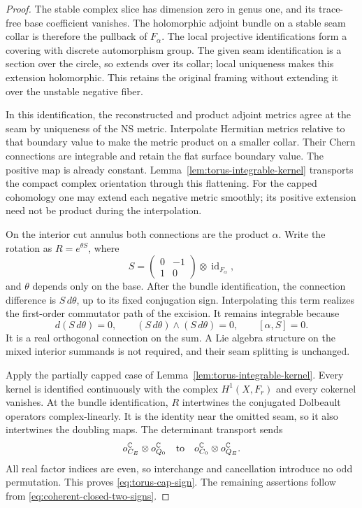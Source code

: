 \documentclass[11pt]{amsart}
\theoremstyle{definition}
\theoremstyle{remark}
\theoremstyle{plain}
\newcommand{\CC}{\mathbb{C}}
\newcommand{\id}{\operatorname{id}}
\begin{document}
\begin{proof}
The stable complex slice has dimension
zero in genus one, and its trace-free
base coefficient vanishes. The
holomorphic adjoint bundle on a stable
seam collar is therefore the pullback
of $F_\alpha$. The local projective
identifications form a covering with
discrete automorphism group. The
given seam identification is a section
over the circle, so extends over its
collar; local uniqueness makes this
extension holomorphic. This retains
the original framing without extending
it over the unstable negative fiber.

In this identification, the reconstructed
and product adjoint metrics agree at
the seam by uniqueness of the NS
metric. Interpolate Hermitian metrics
relative to that boundary value to
make the metric product on a smaller
collar. Their Chern connections are
integrable and retain the flat surface
boundary value. The positive map is
already constant.
Lemma~\ref{lem:torus-integrable-kernel}
transports the compact complex
orientation through this flattening.
For the capped cohomology one may
extend each negative metric smoothly;
its positive extension need not be
product during the interpolation.

On the interior cut annulus both
connections are the product $\alpha$.
Write the rotation as $R=e^{\theta S}$,
where
\[
 S=\begin{pmatrix}0&-1\\1&0\end{pmatrix}
                              \otimes\id_{F_\alpha},
\]
and $\theta$ depends only on the base.
After the bundle identification,
the connection difference is
$S\,d\theta$, up to its fixed
conjugation sign. Interpolating
this term realizes the first-order
commutator path of the excision.
It remains integrable because
\[
 d(S\,d\theta)=0,\qquad
 (S\,d\theta)\wedge(S\,d\theta)=0,\qquad
                         [\alpha,S]=0.
\]
It is a real orthogonal connection
on the sum. A Lie algebra structure
on the mixed interior summands
is not required, and their seam
splitting is unchanged.

Apply the partially capped case
of Lemma~\ref{lem:torus-integrable-kernel}.
Every kernel is identified
continuously with the complex
$H^1(X,F_r)$ and every cokernel
vanishes. At the bundle
identification, $R$ intertwines
the conjugated Dolbeault
operators complex-linearly.
It is the identity near the
omitted seam, so it also
intertwines the doubling maps.
The determinant transport sends
\[
 o_{C_E}^{\CC}\otimes o_{Q_0}^{\CC}
                \quad\hbox{to}\quad
 o_{C_0}^{\CC}\otimes o_{Q_E}^{\CC}.
\]
All real factor indices are even,
so interchange and cancellation
introduce no odd permutation.
This proves \eqref{eq:torus-cap-sign}.
The remaining assertions follow
from \eqref{eq:coherent-closed-two-signs}.
\end{proof}
\end{document}
